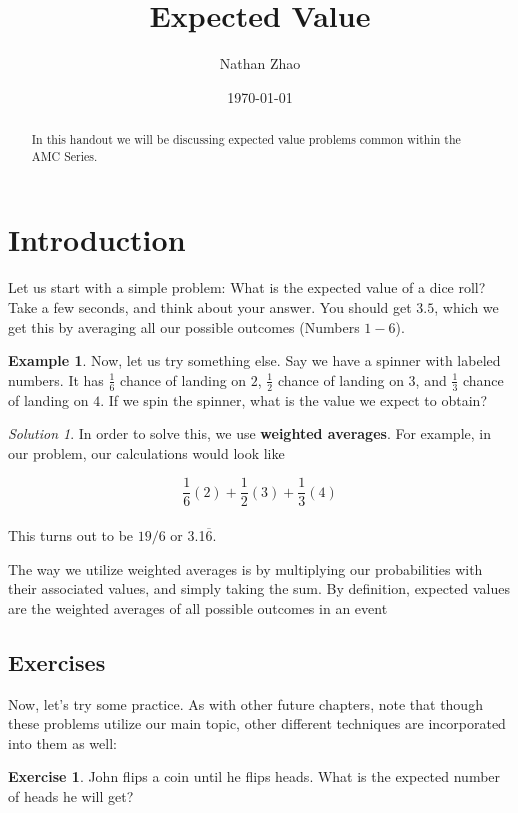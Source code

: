 \documentclass[letterpaper]{article}
\title{Expected Value}
\author{Nathan Zhao}
\date{\today}
\theoremstyle{definition}
\newtheorem{example}[thm]{Example}
\theoremstyle{remark}
\newtheorem*{solution}{Solution}
\theoremstyle{definition}
\newtheorem{exercise}[thm]{Exercise}
\begin{document}
\maketitle

\begin{abstract}
In this handout we will be discussing expected value problems common within the AMC Series.
\end{abstract}

\section{Introduction}
Let us start with a simple problem: What is the expected value of a dice roll? Take a few seconds, and think about your answer. You should get $3.5$, which we get this by averaging all our possible outcomes (Numbers $1-6$).

\begin{example}
Now, let us try something else. Say we have a spinner with labeled numbers. It has $\frac{1}{6}$ chance of landing on $2$, $\frac{1}{2}$ chance of landing on $3$, and $\frac{1}{3}$ chance of landing on $4$. If we spin the spinner, what is the value we expect to obtain?
\end{example}

\begin{solution}
In order to solve this, we use \textbf{weighted averages}. For example, in our problem, our calculations would look like

$$\frac{1}{6}(2) + \frac{1}{2}(3) + \frac{1}{3}(4)$$\\
This turns out to be $19/6$ or 3.1$\overline{6}$.\\
\end{solution}

\noindent
The way we utilize weighted averages is by multiplying our probabilities with their associated values, and simply taking the sum. By definition, expected values are the weighted averages of all possible outcomes in an event

\subsection*{Exercises}
Now, let's try some practice. As with other future chapters, note that though these problems utilize our main topic, other different techniques are incorporated into them as well:

\begin{exercise}
    John flips a coin until he flips heads. What is the expected number of heads he will get?
\end{exercise}
\end{document}
